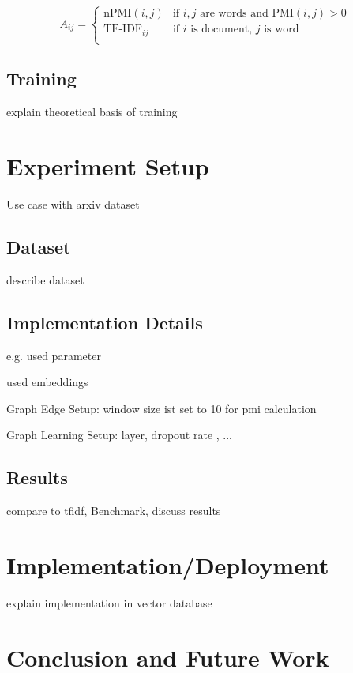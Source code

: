 \documentclass[twocolumn]{webofc}
\begin{document}
\[A_{ij} = 
\begin{cases} 
    \text{nPMI}(i, j) & \text{if } i, j \text{ are words and } \text{PMI}(i, j) > 0 \\
    \text{TF-IDF}_{ij} & \text{if } i \text{ is document, } j \text{ is word} \\
\end{cases}
\]


\subsection{Training}

explain theoretical basis of training


\section{Experiment Setup}

Use case with arxiv dataset

\subsection{Dataset}

describe dataset

\subsection{Implementation Details}

e.g. used parameter

used embeddings

Graph Edge Setup: window size ist set to 10 for pmi calculation

Graph Learning Setup: layer, dropout rate , ...


\subsection{Results}

compare to tfidf, Benchmark, discuss results

\section{Implementation/Deployment}

explain implementation in vector database

\section{Conclusion and Future Work}
\end{document}
